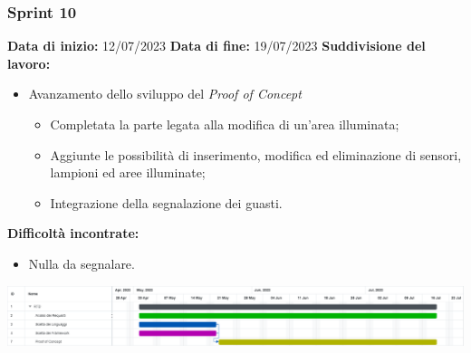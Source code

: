 \documentclass[a4paper, 12pt]{article}
\begin{document}
\newpage

\subsubsection{Sprint 10}
\textbf{Data di inizio:} 12/07/2023\newline
\textbf{Data di fine:} 19/07/2023\newline
\newline
\textbf{Suddivisione del lavoro:}
\begin{itemize}
    \item Avanzamento dello sviluppo del \textit{Proof of Concept}
    \begin{itemize}
        \item Completata la parte legata alla modifica di un'area illuminata;
        \item Aggiunte le possibilità di inserimento, modifica ed eliminazione
        di sensori, lampioni ed aree illuminate;
        \item Integrazione della segnalazione dei guasti.
    \end{itemize}
\end{itemize}
\textbf{Difficoltà incontrate:}
\begin{itemize}
    \item Nulla da segnalare.
\end{itemize}
\includegraphics[scale=0.178]{RTB_9.png}\newline
\newline
\end{document}
